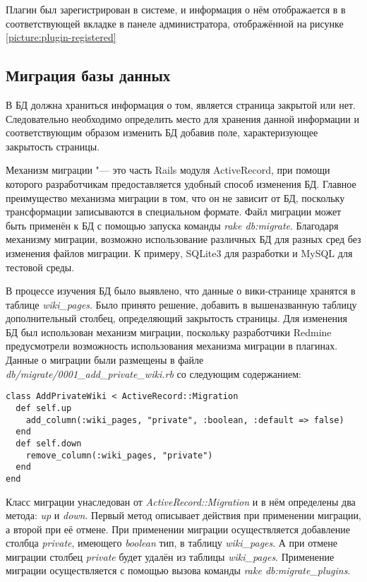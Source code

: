 Плагин был зарегистрирован в системе, и информация о нём отображается в в
соответствующей вкладке в панеле администратора, отображённой на рисунке
\ref{picture:plugin-registered}

\subsection{Миграция базы данных} 
\label{section:migration}
В БД должна храниться информация о том, является страница закрытой или нет.
Следовательно необходимо определить место для хранения данной информации и
соответствующим образом изменить БД добавив поле, характеризующее закрытость
страницы. 

Механизм миграции "--- это часть Rails модуля ActiveRecord, при помощи которого
разработчикам предоставляется удобный способ изменения БД. Главное преимущество
механизма миграции в том, что он не зависит от БД, поскольку трансформации
записываются в специальном формате. Файл миграции может быть применён к БД с
помощью запуска команды \textit{rake db:migrate}. Благодаря механизму миграции,
возможно использование различных БД для разных сред без изменения файлов
миграции. К примеру, SQLite3 для разработки и MySQL для тестовой среды.

В процессе изучения БД было выявлено, что данные о вики-странице хранятся в
таблице \textit{wiki\_pages}. Было принято решение, добавить в вышеназванную
таблицу дополнительный столбец, определяющий закрытость страницы. Для изменения
БД был использован механизм миграции, поскольку разработчики Redmine
предусмотрели возможность использования механизма миграции в плагинах. Данные о
миграции были размещены в файле \textit{db/migrate/0001\_add\_private\_wiki.rb}
со следующим содержанием:
\small{\begin{lstlisting}
class AddPrivateWiki < ActiveRecord::Migration
  def self.up
    add_column(:wiki_pages, "private", :boolean, :default => false)
  end
  def self.down
    remove_column(:wiki_pages, "private")
  end
end
\end{lstlisting}}
Класс миграции унаследован от \textit{ActiveRecord::Migration} и в нём
определены два метода: \textit{up} и \textit{down}.
Первый метод описывает действия при применении миграции, а второй при её
отмене. При применении миграции осуществляется добавление столбца
\textit{private}, имеющего \textit{boolean} тип, в таблицу
\textit{wiki\_pages}. А при отмене миграции столбец \textit{private} будет
удалён из таблицы \textit{wiki\_pages}. Применение миграции осуществляется с
помощью вызова команды \textit{rake db:migrate\_plugins}.


